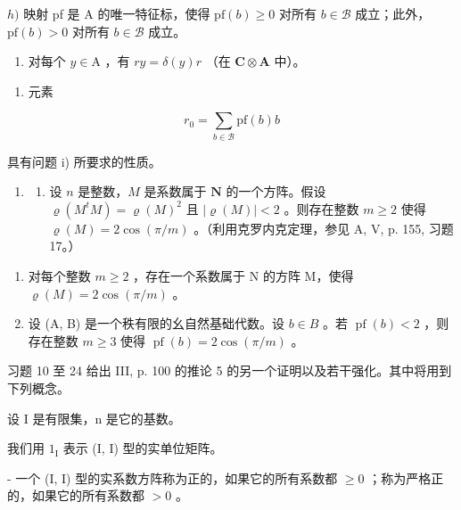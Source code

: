 \(h)\) 映射 pf 是 A 的唯一特征标，使得 \(\mathrm{pf}(b) \geqslant 0\) 对所有 \(b \in \mathcal{B}\) 成立；此外，\(\mathrm{pf}(b) > 0\) 对所有 \(b \in \mathcal{B}\) 成立。

\begin{enumerate}
\def\labelenumi{\roman{enumi})}
\tightlist
\item
  对每个 \(y \in \mathrm{A}\) ，有 \(ry = \delta(y)r\) （在 \(\mathbf{C} \otimes \mathbf{A}\) 中）。
\end{enumerate}

\begin{enumerate}
\def\labelenumi{\alph{enumi})}
\setcounter{enumi}{9}
\tightlist
\item
  元素
\end{enumerate}

\[
r _ {0} = \sum_ {b \in \mathcal {B}} \mathrm{pf} (b) b
\]

具有问题 i) 所要求的性质。

\begin{enumerate}
\def\labelenumi{\arabic{enumi})}
\setcounter{enumi}{8}
\tightlist
\item
  \begin{enumerate}
  \def\labelenumii{\alph{enumii})}
  \tightlist
  \item
    设 \(n\) 是整数，\(M\) 是系数属于 \(\mathbf{N}\) 的一个方阵。假设 \(\varrho(M^t M) = \varrho(M)^2\) 且 \(|\varrho(M)| < 2\) 。则存在整数 \(m \geqslant 2\) 使得 \(\varrho(M) = 2\cos(\pi/m)\) 。（利用克罗内克定理，参见 A, V, p. 155, 习题 17。）
  \end{enumerate}
\end{enumerate}

\begin{enumerate}
\def\labelenumi{\alph{enumi})}
\setcounter{enumi}{1}
\item
  对每个整数 \(m \geqslant 2\) ，存在一个系数属于 N 的方阵 M，使得 \(\varrho(M) = 2 \cos(\pi/m)\) 。
\item
  设 (A, B) 是一个秩有限的幺自然基础代数。设 \(b \in B\) 。若 \(\operatorname{pf}(b) < 2\) ，则存在整数 \(m \geqslant 3\) 使得 \(\operatorname{pf}(b) = 2 \cos(\pi/m)\) 。
\end{enumerate}

习题 10 至 24 给出 III, p. 100 的推论 5 的另一个证明以及若干强化。其中将用到下列概念。

设 I 是有限集，n 是它的基数。

我们用 \(1_{\mathrm{I}}\) 表示 (I, I) 型的实单位矩阵。

- 一个 (I, I) 型的实系数方阵称为正的，如果它的所有系数都 \(\geqslant 0\) ；称为严格正的，如果它的所有系数都 \(>0\) 。

